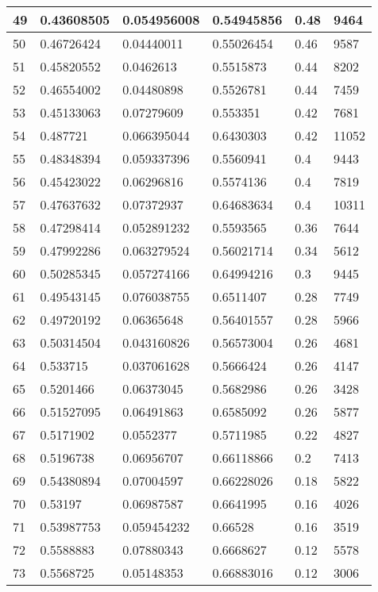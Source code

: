 \begin{longtable}{|l|l|l|l|l|l|}
49 & 0.43608505 & 0.054956008 & 0.54945856 & 0.48 & 9464 \\ \hline 
50 & 0.46726424 & 0.04440011 & 0.55026454 & 0.46 & 9587 \\ \hline 
51 & 0.45820552 & 0.0462613 & 0.5515873 & 0.44 & 8202 \\ \hline 
52 & 0.46554002 & 0.04480898 & 0.5526781 & 0.44 & 7459 \\ \hline 
53 & 0.45133063 & 0.07279609 & 0.553351 & 0.42 & 7681 \\ \hline 
54 & 0.487721 & 0.066395044 & 0.6430303 & 0.42 & 11052 \\ \hline 
55 & 0.48348394 & 0.059337396 & 0.5560941 & 0.4 & 9443 \\ \hline 
56 & 0.45423022 & 0.06296816 & 0.5574136 & 0.4 & 7819 \\ \hline 
57 & 0.47637632 & 0.07372937 & 0.64683634 & 0.4 & 10311 \\ \hline 
58 & 0.47298414 & 0.052891232 & 0.5593565 & 0.36 & 7644 \\ \hline 
59 & 0.47992286 & 0.063279524 & 0.56021714 & 0.34 & 5612 \\ \hline 
60 & 0.50285345 & 0.057274166 & 0.64994216 & 0.3 & 9445 \\ \hline 
61 & 0.49543145 & 0.076038755 & 0.6511407 & 0.28 & 7749 \\ \hline 
62 & 0.49720192 & 0.06365648 & 0.56401557 & 0.28 & 5966 \\ \hline 
63 & 0.50314504 & 0.043160826 & 0.56573004 & 0.26 & 4681 \\ \hline 
64 & 0.533715 & 0.037061628 & 0.5666424 & 0.26 & 4147 \\ \hline 
65 & 0.5201466 & 0.06373045 & 0.5682986 & 0.26 & 3428 \\ \hline 
66 & 0.51527095 & 0.06491863 & 0.6585092 & 0.26 & 5877 \\ \hline 
67 & 0.5171902 & 0.0552377 & 0.5711985 & 0.22 & 4827 \\ \hline 
68 & 0.5196738 & 0.06956707 & 0.66118866 & 0.2 & 7413 \\ \hline 
69 & 0.54380894 & 0.07004597 & 0.66228026 & 0.18 & 5822 \\ \hline 
70 & 0.53197 & 0.06987587 & 0.6641995 & 0.16 & 4026 \\ \hline 
71 & 0.53987753 & 0.059454232 & 0.66528 & 0.16 & 3519 \\ \hline 
72 & 0.5588883 & 0.07880343 & 0.6668627 & 0.12 & 5578 \\ \hline 
73 & 0.5568725 & 0.05148353 & 0.66883016 & 0.12 & 3006 \\ \hline 

\end{longtable}
